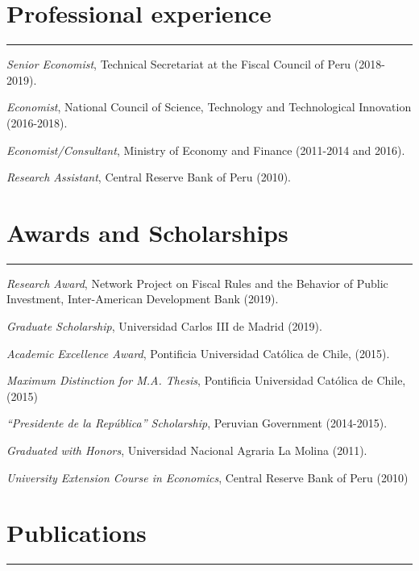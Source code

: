 \documentclass[letterpaper, Biolinum]{article}
\renewenvironment{itemize}{
  \begin{list}{}{
    \setlength{\leftmargin}{1.5em}
  }
}{
  \end{list}
}
\begin{document}
\section*{Professional experience}
\vspace{-0.1in}
\hrule
\vspace{0.1in}
\begin{itemize}
\item \textit{Senior Economist}, Technical Secretariat at the Fiscal Council of Peru (2018-2019).
\item \textit{Economist}, National Council of Science, Technology and Technological Innovation (2016-2018).
\item \textit{Economist/Consultant}, Ministry of Economy and Finance (2011-2014 and 2016).
\item \textit{Research Assistant}, Central Reserve Bank of Peru (2010).
\end{itemize}

\section*{Awards and Scholarships}
\vspace{-0.1in}
\hrule
\vspace{0.1in}
\begin{itemize} 
\item \textit{Research Award}, Network Project on Fiscal Rules and the Behavior of Public Investment, Inter-American Development Bank (2019).
\item \textit{Graduate Scholarship}, Universidad Carlos III de Madrid (2019). 
\item \textit{Academic Excellence Award}, Pontificia Universidad Cat\'olica de Chile, (2015).
\item \textit{Maximum Distinction for M.A. Thesis}, Pontificia Universidad Cat\'olica de Chile, (2015)
\item \textit{``Presidente de la Rep\'ublica'' Scholarship}, Peruvian Government (2014-2015). 
\item \textit{Graduated with Honors}, Universidad Nacional Agraria La Molina (2011).
\item \textit{University Extension Course in Economics}, Central Reserve Bank of Peru (2010)
\end{itemize}

\section*{Publications}
\vspace{-0.1in}
\hrule
\vspace{0.1in}
\end{document}
